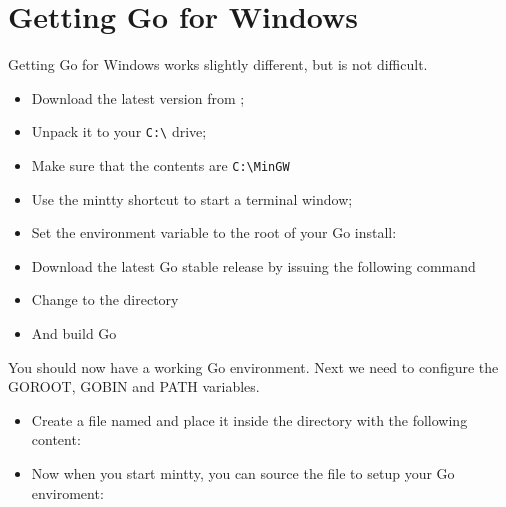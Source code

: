 \section{Getting Go for Windows}
Getting Go for Windows works slightly different, but is not difficult.
\begin{itemize}
\item Download the latest version from \cite{go_windows};
\item Unpack it to your \verb|C:\| drive;
\item Make sure that the contents are \verb|C:\MinGW|
\item Use the mintty shortcut to start a terminal window;
\item Set the environment variable  to the root of your
Go install:
\begin{display}
\pr {}
\end{display}
\item Download the latest Go stable release by issuing the following command
\begin{display}
\pr {}
\end{display}
\item Change to the  directory
\begin{display}
\pr {}
\end{display}
\item And build Go
\begin{display}
\pr {}
\end{display}
\end{itemize}
You should now have a working Go environment. Next we need to configure
the GOROOT, GOBIN and PATH variables.

\begin{itemize}
\item Create a file named  and place it inside the  directory
with the following content:
\item Now when you start mintty, you can source the file to setup your Go enviroment:
\begin{display}
\pr {}
\end{display}
\end{itemize}

